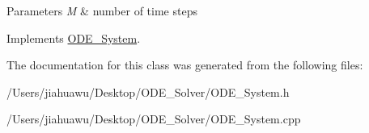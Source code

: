 \begin{DoxyParams}{Parameters}
{\em M} & number of time steps \\
\hline
\end{DoxyParams}


Implements \mbox{\hyperlink{class_o_d_e___system_a5fe78282ecf67d851f1a2363a028e6dd}{O\+D\+E\+\_\+\+System}}.



The documentation for this class was generated from the following files\+:\begin{DoxyCompactItemize}
\item 
/\+Users/jiahuawu/\+Desktop/\+O\+D\+E\+\_\+\+Solver/O\+D\+E\+\_\+\+System.\+h\item 
/\+Users/jiahuawu/\+Desktop/\+O\+D\+E\+\_\+\+Solver/O\+D\+E\+\_\+\+System.\+cpp\end{DoxyCompactItemize}
